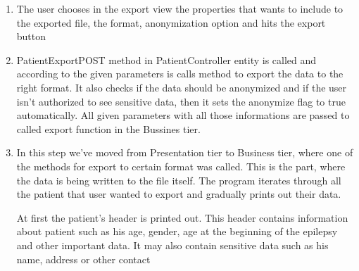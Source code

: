 \documentclass[thesis=B,english]{FITthesis}[2012/10/20]
\begin{document}
\begin{enumerate}
\item{ The user chooses in the export view the properties that wants to include to the exported file, the format, anonymization option and hits the export button }
\item{ PatientExportPOST method in PatientController entity is called and according to the given parameters is calls method to export the data to the right format. It also checks if the data should be anonymized and if the user isn't authorized to see sensitive data, then it sets the anonymize flag to true automatically. All given parameters with all those informations are passed to called export function in the Bussines tier.}
\item{ In this step we've moved from Presentation tier to Business tier, where one of the methods for export to certain format was called. This is the part, where the data is being written to the file itself. The program iterates through all the patient that user wanted to export and gradually prints out their data. 

At first the patient's header is printed out. This header contains information about patient such as his age, gender, age at the beginning of the epilepsy and other important data. It may also contain sensitive data such as his name, address or other contact 
}
\end{enumerate}
\end{document}
